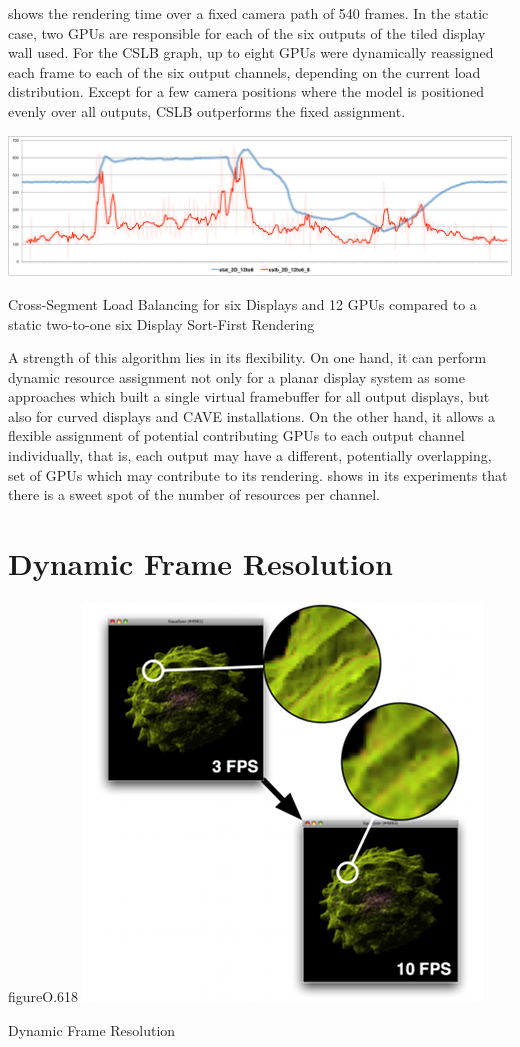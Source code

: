  shows the rendering time over a fixed camera path of 540 frames.
In the static case, two GPUs are responsible for each of the six outputs of the
tiled display wall used. For the CSLB graph, up to eight GPUs were dynamically
reassigned each frame to each of the six output channels, depending on the
current load distribution. Except for a few camera positions where the model is
positioned evenly over all outputs, CSLB outperforms the fixed assignment.

\begin{benchmark}[h!t]
  \centering
  \includegraphics[width=\textwidth]{results/cslb}
  \caption{Cross-Segment Load Balancing for six Displays and 12 GPUs compared to a static two-to-one six Display Sort-First Rendering}
  \label{rCSLB}
\end{benchmark}

A strength of this algorithm lies in its flexibility. On one hand, it can
perform dynamic resource assignment not only for a planar display system as
some approaches which built a single virtual framebuffer for all output
displays, but also for curved displays and CAVE installations. On the other
hand, it allows a flexible assignment of potential contributing GPUs to each
output channel individually, that is, each output may have a different,
potentially overlapping, set of GPUs which may contribute to its rendering.
\cite{EEP:11} shows in its experiments that there is a sweet spot of the number
of resources per channel.

\section{Dynamic Frame Resolution}

\begin{wrapfloat}{figure}{O}{.618\textwidth}
  \includegraphics[width=.618\textwidth]{images/dfr}
  \caption{\label{fdfr}Dynamic Frame Resolution}
\end{wrapfloat}

